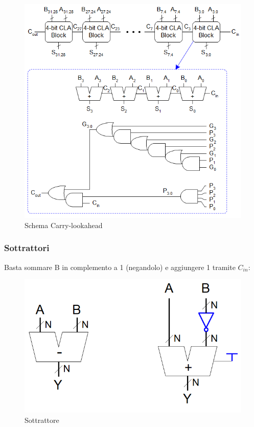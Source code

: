 \documentclass{article}
\begin{document}
\newpage

\begin{figure}[ht]
    \centering
    \includegraphics[width=\linewidth]{adder_carry.png}
    \caption{Schema Carry-lookahead}
    \label{fig:carry-lookahead}
\end{figure}

\newpage

\subsubsection{Sottrattori}

Basta sommare B in complemento a 1 (negandolo) e aggiungere 1 tramite $C_{in}$:

\begin{figure}[ht]
    \centering
    \includegraphics[width=0.7\linewidth]{subtracter.png}
    \caption{Sottrattore}
    \label{fig:enter-label}
\end{figure}
\end{document}
